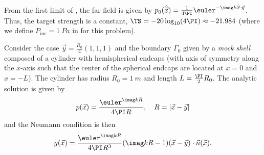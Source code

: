 From the first limit of , the far field is given by $p_0(\hat{\vec{x}})=\frac{1}{4\PI}\euler^{-\imag k \hat{\vec{x}}\cdot\vec{y}}$. Thus, the target strength is a constant, $\TS=-20\log_{10}(4\PI)\approx -21.984$ (where we define $P_{\mathrm{inc}}=\SI{1}{Pa}$ in  for this problem). 

Consider the case $\vec{y}=\frac{R_0}{4}(1,1,1)$ and the boundary $\Gamma_0$ given by a \textit{mock shell} composed of a cylinder with hemispherical endcaps (with axis of symmetry along the $x$-axis such that the center of the spherical endcaps are located at $x = 0$ and $x = -L$). The cylinder has radius $R_0=\SI{1}{m}$ and length $L=\frac{\PI}{2}R_0$. The analytic solution is given by
\begin{equation}
	p(\vec{x}) = \frac{\euler^{\imag kR}}{4\PI R},\quad R=|\vec{x}-\vec{y}|
\end{equation}
and the Neumann condition is then
\begin{equation}
	g(\vec{x}) = \frac{\euler^{\imag kR}}{4\PI R^3}(\imag kR -1) (\vec{x}-\vec{y})\cdot\vec{n}(\vec{x}).
\end{equation}

